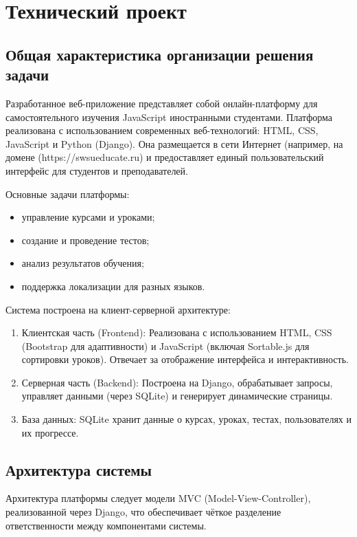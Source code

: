 \section{Технический проект}

\subsection{Общая характеристика организации решения задачи}

Разработанное веб-приложение представляет собой онлайн-платформу для самостоятельного изучения JavaScript иностранными студентами. Платформа реализована с использованием современных веб-технологий: HTML, CSS, JavaScript и Python (Django). Она размещается в сети Интернет (например, на домене (https://swsueducate.ru) и предоставляет единый пользовательский интерфейс для студентов и преподавателей.

Основные задачи платформы:
\begin{itemize}
	\item управление курсами и уроками;
	\item создание и проведение тестов;
	\item анализ результатов обучения;
	\item поддержка локализации для разных языков.
\end{itemize}

Система построена на клиент-серверной архитектуре:
\begin{enumerate}
	\item {Клиентская часть} (Frontend): Реализована с использованием HTML, CSS (Bootstrap для адаптивности) и JavaScript (включая Sortable.js для сортировки уроков). Отвечает за отображение интерфейса и интерактивность.
	\item {Серверная часть} (Backend): Построена на Django, обрабатывает запросы, управляет данными (через SQLite) и генерирует динамические страницы.
	\item {База данных}: SQLite хранит данные о курсах, уроках, тестах, пользователях и их прогрессе.
\end{enumerate}

\subsection{Архитектура системы}

Архитектура платформы следует модели MVC (Model-View-Controller), реализованной через Django, что обеспечивает чёткое разделение ответственности между компонентами системы.


